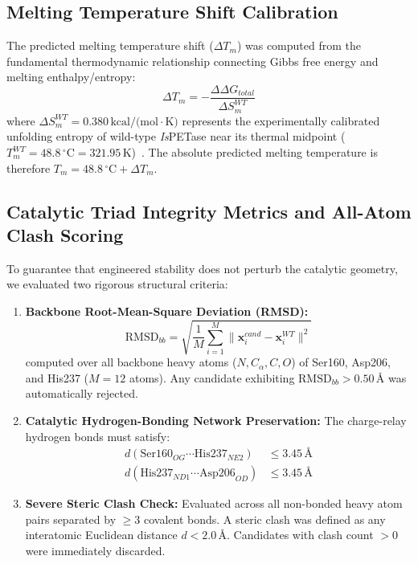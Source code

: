 \documentclass[10pt,twocolumn,a4paper]{article}
\begin{document}
\subsection{Melting Temperature Shift Calibration}
The predicted melting temperature shift ($\Delta T_m$) was computed from the fundamental thermodynamic relationship connecting Gibbs free energy and melting enthalpy/entropy:
\begin{equation}
\Delta T_m = -\frac{\Delta\Delta G_{total}}{\Delta S_m^{WT}}
\label{eq:delta_tm}
\end{equation}
where $\Delta S_m^{WT} = 0.380\,\text{kcal/(mol}\cdot\text{K)}$ represents the experimentally calibrated unfolding entropy of wild-type \textit{Is}PETase near its thermal midpoint ($T_m^{WT} = 48.8\,^\circ\text{C} = 321.95\,\text{K}$)~\cite{Son2019,Cui2021}. The absolute predicted melting temperature is therefore $T_m = 48.8\,^\circ\text{C} + \Delta T_m$.

\subsection{Catalytic Triad Integrity Metrics and All-Atom Clash Scoring}
To guarantee that engineered stability does not perturb the catalytic geometry, we evaluated two rigorous structural criteria:
\begin{enumerate}
    \item \textbf{Backbone Root-Mean-Square Deviation (RMSD):}
    \begin{equation}
    \text{RMSD}_{bb} = \sqrt{\frac{1}{M} \sum_{i=1}^M \|\mathbf{x}_i^{cand} - \mathbf{x}_i^{WT}\|^2}
    \label{eq:rmsd}
    \end{equation}
    computed over all backbone heavy atoms ($N, C_\alpha, C, O$) of Ser160, Asp206, and His237 ($M = 12$ atoms). Any candidate exhibiting $\text{RMSD}_{bb} > 0.50\,\text{\AA}$ was automatically rejected.
    \item \textbf{Catalytic Hydrogen-Bonding Network Preservation:} The charge-relay hydrogen bonds must satisfy:
    \begin{align}
    d(\text{Ser160}_{OG} \cdots \text{His237}_{NE2}) &\le 3.45\,\text{\AA} \\
    d(\text{His237}_{ND1} \cdots \text{Asp206}_{OD}) &\le 3.45\,\text{\AA}
    \end{align}
    \item \textbf{Severe Steric Clash Check:} Evaluated across all non-bonded heavy atom pairs separated by $\ge 3$ covalent bonds. A steric clash was defined as any interatomic Euclidean distance $d < 2.0\,\text{\AA}$. Candidates with clash count $> 0$ were immediately discarded.
\end{enumerate}
\end{document}
